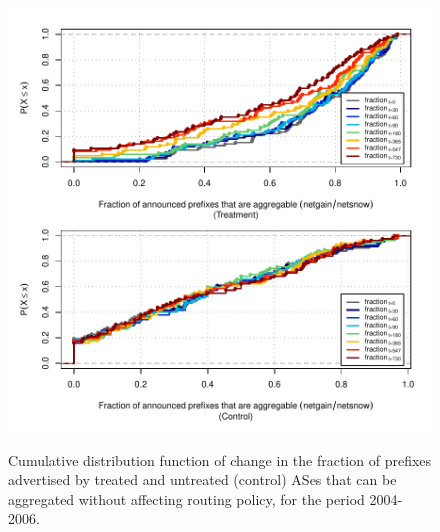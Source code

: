\clearpage
\vspace*{1.25em}
\begin{figure}[H]
\begin{centering}
\begin{singlespace}
\captionsetup{list=no}
    \includegraphics[width=6in]{figures/behavior-frac_deagg-2004_2006-corr.pdf}
    \vspace{-2em}\\
    \caption{Cumulative distribution function of change in the fraction of
    prefixes advertised by treated and untreated (control) ASes that can be
    aggregated without affecting routing policy, for the period 2004-2006.}
\end{singlespace}
\end{centering}
\end{figure}

